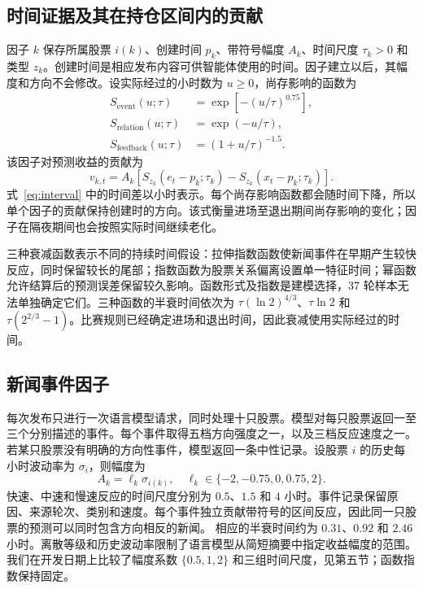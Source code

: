 \documentclass[conference]{IEEEtran}
\begin{document}
\subsection{时间证据及其在持仓区间内的贡献}
因子 $k$ 保存所属股票 $i(k)$、创建时间 $p_k$、带符号幅度 $A_k$、时间尺度 $\tau_k>0$ 和类型 $z_k$。创建时间是相应发布内容可供智能体使用的时间。因子建立以后，其幅度和方向不会修改。设实际经过的小时数为 $u\geq0$，尚存影响的函数为
\begin{align}
 S_{\mathrm{event}}(u;\tau)&=\exp[-(u/\tau)^{0.75}],\\
 S_{\mathrm{relation}}(u;\tau)&=\exp(-u/\tau),\\
 S_{\mathrm{feedback}}(u;\tau)&=(1+u/\tau)^{-1.5}.
\end{align}
该因子对预测收益的贡献为
\begin{equation}
 v_{k,t}=A_k\left[S_{z_k}(e_t-p_k;\tau_k)
                    -S_{z_k}(x_t-p_k;\tau_k)\right].
 \label{eq:interval}
\end{equation}
式~\ref{eq:interval} 中的时间差以小时表示。每个尚存影响函数都会随时间下降，所以单个因子的贡献保持创建时的方向。该式衡量进场至退出期间尚存影响的变化；因子在隔夜期间也会按照实际时间继续老化。

三种衰减函数表示不同的持续时间假设：拉伸指数函数使新闻事件在早期产生较快反应，同时保留较长的尾部；指数函数为股票关系偏离设置单一特征时间；幂函数允许结算后的预测误差保留较久影响。函数形式及指数是建模选择，37 轮样本无法单独确定它们。三种函数的半衰时间依次为 $\tau(\ln 2)^{4/3}$、$\tau\ln 2$ 和 $\tau(2^{2/3}-1)$。比赛规则已经确定进场和退出时间，因此衰减使用实际经过的时间。

\subsection{新闻事件因子}
每次发布只进行一次语言模型请求，同时处理十只股票。模型对每只股票返回一至三个分别描述的事件。每个事件取得五档方向强度之一，以及三档反应速度之一。若某只股票没有明确的方向性事件，模型返回一条中性记录。设股票 $i$ 的历史每小时波动率为 $\sigma_i$，则幅度为
\begin{equation}
 A_k=\ell_k\sigma_{i(k)},\quad
 \ell_k\in\{-2,-0.75,0,0.75,2\}.
\end{equation}
快速、中速和慢速反应的时间尺度分别为 $0.5$、$1.5$ 和 $4$ 小时。事件记录保留原因、来源轮次、类别和速度。每个事件独立贡献带符号的区间反应，因此同一只股票的预测可以同时包含方向相反的新闻。
相应的半衰时间约为 $0.31$、$0.92$ 和 $2.46$ 小时。离散等级和历史波动率限制了语言模型从简短摘要中指定收益幅度的范围。我们在开发日期上比较了幅度系数 $\{0.5,1,2\}$ 和三组时间尺度，见第五节；函数指数保持固定。
\end{document}
